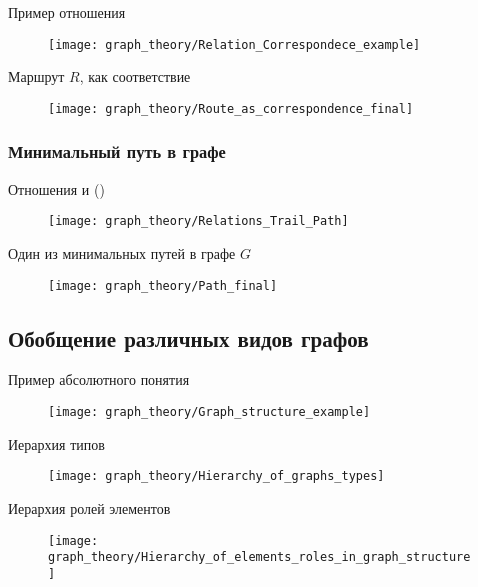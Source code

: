 \begin{frame}{Пример отношения }
  \begin{figure}
    \centering
    \texttt{[image: graph\_theory/Relation\_Correspondece\_example]}
  \end{figure}
\end{frame}

\begin{frame}{Маршрут $R$, как соответствие}
  \begin{figure}
    \centering
    \texttt{[image: graph\_theory/Route\_as\_correspondence\_final]}
  \end{figure}
\end{frame}

\subsubsection{Минимальный путь в графе}

\begin{frame}{Отношения  и  ()}
  \begin{figure}
    \centering
    \texttt{[image: graph\_theory/Relations\_Trail\_Path]}
  \end{figure}
\end{frame}

\begin{frame}{Один из минимальных путей в графе $G$}
  \begin{figure}
    \centering
    \texttt{[image: graph\_theory/Path\_final]}
  \end{figure}
\end{frame}

\subsection{Обобщение различных видов графов}

\begin{frame}{Пример абсолютного понятия }
  \begin{figure}
    \centering
    \texttt{[image: graph\_theory/Graph\_structure\_example]}
  \end{figure}
\end{frame}

\begin{frame}{Иерархия типов }
  \begin{figure}
    \centering
    \texttt{[image: graph\_theory/Hierarchy\_of\_graphs\_types]}
  \end{figure}
\end{frame}

\begin{frame}{Иерархия ролей элементов }
  \begin{figure}
    \centering
    \texttt{[image: graph\_theory/Hierarchy\_of\_elements\_roles\_in\_graph\_structure]}
  \end{figure}
\end{frame}

